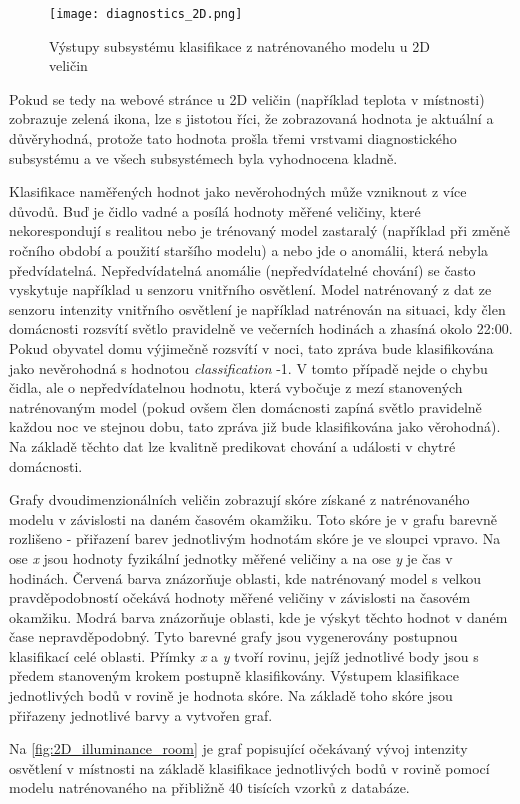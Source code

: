 \begin{figure}[H]
  \centering
  \texttt{[image: diagnostics\_2D.png]}
  \caption{Výstupy subsystému klasifikace z natrénovaného modelu u 2D veličin}
  \label{fig:diagnostics_2D}
\end{figure}  

Pokud se tedy na webové stránce u 2D veličin (například teplota v místnosti) zobrazuje zelená ikona, lze s jistotou říci, že zobrazovaná hodnota je aktuální a důvěryhodná, protože tato hodnota prošla třemi vrstvami diagnostického subsystému a ve všech subsystémech byla vyhodnocena kladně. \par
Klasifikace naměřených hodnot jako nevěrohodných může vzniknout z více důvodů. Buď je čidlo vadné a posílá hodnoty měřené veličiny, které nekorespondují s realitou nebo je trénovaný model zastaralý (například při změně ročního období a použití staršího modelu) a nebo jde o anomálii, která nebyla předvídatelná. Nepředvídatelná anomálie (nepředvídatelné chování) se často vyskytuje například u senzoru vnitřního osvětlení. Model natrénovaný z dat ze senzoru intenzity vnitřního osvětlení je například natrénován na situaci, kdy člen domácnosti rozsvítí světlo pravidelně ve večerních hodinách a zhasíná okolo 22:00. Pokud obyvatel domu výjimečně rozsvítí v noci, tato zpráva bude klasifikována jako nevěrohodná s hodnotou \textit{classification} -1. V tomto případě nejde o chybu čidla, ale o nepředvídatelnou hodnotu, která vybočuje z mezí stanovených natrénovaným model (pokud ovšem člen domácnosti zapíná světlo pravidelně každou noc ve stejnou dobu, tato zpráva již bude klasifikována jako věrohodná). Na základě těchto dat lze kvalitně predikovat chování a události v chytré domácnosti. \par
Grafy dvoudimenzionálních veličin zobrazují skóre získané z natrénovaného modelu v závislosti na daném časovém okamžiku. Toto skóre je v grafu barevně rozlišeno - přiřazení barev jednotlivým hodnotám skóre je ve sloupci vpravo. Na ose \textit{x} jsou hodnoty fyzikální jednotky měřené veličiny a na ose \textit{y} je čas v hodinách. Červená barva znázorňuje oblasti, kde natrénovaný model s velkou pravděpodobností očekává hodnoty měřené veličiny v závislosti na časovém okamžiku. Modrá barva znázorňuje oblasti, kde je výskyt těchto hodnot v daném čase nepravděpodobný. Tyto barevné grafy jsou vygenerovány postupnou klasifikací celé oblasti. Přímky \textit{x} a \textit{y} tvoří rovinu, jejíž jednotlivé body jsou s předem stanoveným krokem postupně klasifikovány. Výstupem klasifikace jednotlivých bodů v rovině je hodnota skóre. Na základě toho skóre jsou přiřazeny jednotlivé barvy a vytvořen graf. \par
Na \cref{fig:2D_illuminance_room} je graf popisující očekávaný vývoj intenzity osvětlení v místnosti na základě klasifikace jednotlivých bodů v rovině pomocí modelu natrénovaného na přibližně 40 tisících vzorků z databáze.

